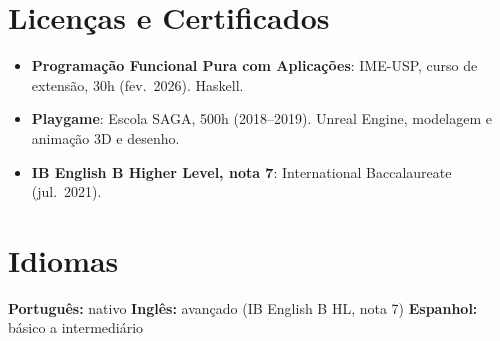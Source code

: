 \documentclass[10pt,a4paper]{article}
\begin{document}

\section{Licenças e Certificados}
\begin{itemize}
  \item \textbf{Programação Funcional Pura com Aplicações}: IME-USP, curso de extensão, 30h (fev.\ 2026). Haskell.
  \item \textbf{Playgame}: Escola SAGA, 500h (2018--2019). Unreal Engine, modelagem e animação 3D e desenho.
  \item \textbf{IB English B Higher Level, nota 7}: International Baccalaureate (jul.\ 2021).
\end{itemize}

\section{Idiomas}
\textbf{Português:} nativo \quad\textbar\quad \textbf{Inglês:} avançado (IB English B HL, nota 7) \quad\textbar\quad \textbf{Espanhol:} básico a intermediário
\end{document}
